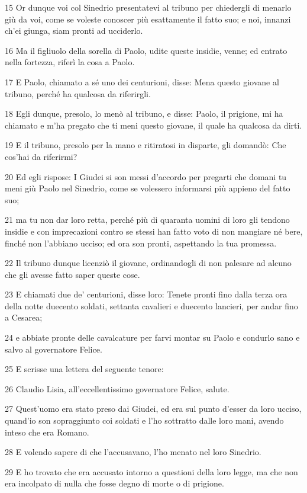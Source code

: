 \par 15 Or dunque voi col Sinedrio presentatevi al tribuno per chiedergli di menarlo giù da voi, come se voleste conoscer più esattamente il fatto suo; e noi, innanzi ch'ei giunga, siam pronti ad ucciderlo.
\par 16 Ma il figliuolo della sorella di Paolo, udite queste insidie, venne; ed entrato nella fortezza, riferì la cosa a Paolo.
\par 17 E Paolo, chiamato a sé uno dei centurioni, disse: Mena questo giovane al tribuno, perché ha qualcosa da riferirgli.
\par 18 Egli dunque, presolo, lo menò al tribuno, e disse: Paolo, il prigione, mi ha chiamato e m'ha pregato che ti meni questo giovane, il quale ha qualcosa da dirti.
\par 19 E il tribuno, presolo per la mano e ritiratosi in disparte, gli domandò: Che cos'hai da riferirmi?
\par 20 Ed egli rispose: I Giudei si son messi d'accordo per pregarti che domani tu meni giù Paolo nel Sinedrio, come se volessero informarsi più appieno del fatto suo;
\par 21 ma tu non dar loro retta, perché più di quaranta uomini di loro gli tendono insidie e con imprecazioni contro se stessi han fatto voto di non mangiare né bere, finché non l'abbiano ucciso; ed ora son pronti, aspettando la tua promessa.
\par 22 Il tribuno dunque licenziò il giovane, ordinandogli di non palesare ad alcuno che gli avesse fatto saper queste cose.
\par 23 E chiamati due de' centurioni, disse loro: Tenete pronti fino dalla terza ora della notte duecento soldati, settanta cavalieri e duecento lancieri, per andar fino a Cesarea;
\par 24 e abbiate pronte delle cavalcature per farvi montar su Paolo e condurlo sano e salvo al governatore Felice.
\par 25 E scrisse una lettera del seguente tenore:
\par 26 Claudio Lisia, all'eccellentissimo governatore Felice, salute.
\par 27 Quest'uomo era stato preso dai Giudei, ed era sul punto d'esser da loro ucciso, quand'io son sopraggiunto coi soldati e l'ho sottratto dalle loro mani, avendo inteso che era Romano.
\par 28 E volendo sapere di che l'accusavano, l'ho menato nel loro Sinedrio.
\par 29 E ho trovato che era accusato intorno a questioni della loro legge, ma che non era incolpato di nulla che fosse degno di morte o di prigione.
